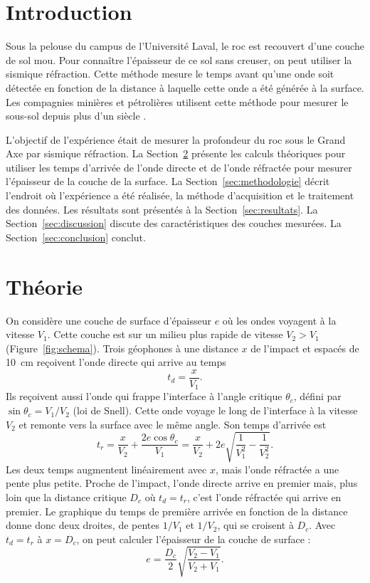 \documentclass[11pt,letterpaper]{article}
\newcommand{\beq}[1]{\begin{equation} \label{#1}}
\def\enq{\end{equation}}
\begin{document}
\section{Introduction}

Sous la pelouse du campus de l'Université Laval, le roc est recouvert d'une couche de sol mou. Pour connaître l'épaisseur de ce sol sans creuser, on peut utiliser la sismique réfraction. Cette méthode mesure le temps avant qu'une onde soit détectée en fonction de la distance à laquelle cette onde a été générée à la surface. Les compagnies minières et pétrolières utilisent cette méthode pour mesurer le sous-sol depuis plus d'un siècle \cite{telford}.

L'objectif de l'expérience était de mesurer la profondeur du roc sous le Grand Axe par sismique réfraction. La Section~\ref{sec:theorie} présente les calculs théoriques pour utiliser les temps d'arrivée de l'onde directe et de l'onde réfractée pour mesurer l'épaisseur de la couche de la surface. La Section~\ref{sec:methodologie} décrit l'endroit où l'expérience a été réalisée, la méthode d'acquisition et le traitement des données. Les résultats sont présentés à la Section~\ref{sec:resultats}. La Section~\ref{sec:discussion} discute des caractéristiques des couches mesurées. La Section~\ref{sec:conclusion} conclut.

\section{Théorie}
\label{sec:theorie}

On considère une couche de surface d'épaisseur $e$ où les ondes voyagent à la vitesse $V_1$. Cette couche est sur un milieu plus rapide de vitesse $V_2 > V_1$ (Figure~\ref{fig:schema}). Trois géophones à une distance $x$ de l'impact et espacés de 10~cm reçoivent l'onde directe qui arrive au temps
\beq{eq:directe}
    t_d = \frac{x}{V_1} .
\enq
Ils reçoivent aussi l'onde qui frappe l'interface à l'angle critique $\theta_c$, défini par $\sin\theta_c = V_1/V_2$ (loi de Snell). Cette onde voyage le long de l'interface à la vitesse $V_2$ et remonte vers la surface avec le même angle. Son temps d'arrivée est \cite{telford}
\beq{eq:refractee}
    t_r = \frac{x}{V_2} + \frac{2e\cos\theta_c}{V_1} = \frac{x}{V_2} + 2e\sqrt{\frac{1}{V_1^2} - \frac{1}{V_2^2}} .
\enq
Les deux temps augmentent linéairement avec $x$, mais l'onde réfractée a une pente plus petite. Proche de l'impact, l'onde directe arrive en premier mais, plus loin que la distance critique $D_c$ où $t_d = t_r$, c'est l'onde réfractée qui arrive en premier. Le graphique du temps de première arrivée en fonction de la distance donne donc deux droites, de pentes $1/V_1$ et $1/V_2$, qui se croisent à $D_c$. Avec $t_d = t_r$ à $x = D_c$, on peut calculer l'épaisseur de la couche de surface \cite{protocole}:
\beq{eq:epaisseur}
    e = \frac{D_c}{2}\sqrt{\frac{V_2 - V_1}{V_2 + V_1}} .
\enq
\end{document}
